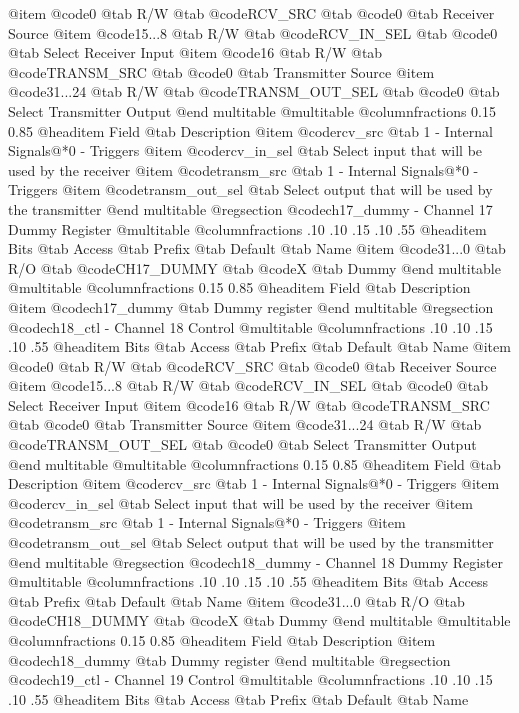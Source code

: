 @item @code{0}
@tab R/W @tab
@code{RCV_SRC}
@tab @code{0} @tab 
Receiver Source
@item @code{15...8}
@tab R/W @tab
@code{RCV_IN_SEL}
@tab @code{0} @tab 
Select Receiver Input
@item @code{16}
@tab R/W @tab
@code{TRANSM_SRC}
@tab @code{0} @tab 
Transmitter Source
@item @code{31...24}
@tab R/W @tab
@code{TRANSM_OUT_SEL}
@tab @code{0} @tab 
Select Transmitter Output
@end multitable
@multitable @columnfractions 0.15 0.85
@headitem Field @tab Description
@item @code{rcv_src} @tab 1 - Internal Signals@*0 - Triggers
@item @code{rcv_in_sel} @tab Select input that will be used by the receiver
@item @code{transm_src} @tab 1 - Internal Signals@*0 - Triggers
@item @code{transm_out_sel} @tab Select output that will be used by the transmitter
@end multitable
@regsection @code{ch17_dummy} - Channel 17 Dummy Register
@multitable @columnfractions .10 .10 .15 .10 .55
@headitem Bits @tab Access @tab Prefix @tab Default @tab Name
@item @code{31...0}
@tab R/O @tab
@code{CH17_DUMMY}
@tab @code{X} @tab 
Dummy
@end multitable
@multitable @columnfractions 0.15 0.85
@headitem Field @tab Description
@item @code{ch17_dummy} @tab Dummy register
@end multitable
@regsection @code{ch18_ctl} - Channel 18 Control
@multitable @columnfractions .10 .10 .15 .10 .55
@headitem Bits @tab Access @tab Prefix @tab Default @tab Name
@item @code{0}
@tab R/W @tab
@code{RCV_SRC}
@tab @code{0} @tab 
Receiver Source
@item @code{15...8}
@tab R/W @tab
@code{RCV_IN_SEL}
@tab @code{0} @tab 
Select Receiver Input
@item @code{16}
@tab R/W @tab
@code{TRANSM_SRC}
@tab @code{0} @tab 
Transmitter Source
@item @code{31...24}
@tab R/W @tab
@code{TRANSM_OUT_SEL}
@tab @code{0} @tab 
Select Transmitter Output
@end multitable
@multitable @columnfractions 0.15 0.85
@headitem Field @tab Description
@item @code{rcv_src} @tab 1 - Internal Signals@*0 - Triggers
@item @code{rcv_in_sel} @tab Select input that will be used by the receiver
@item @code{transm_src} @tab 1 - Internal Signals@*0 - Triggers
@item @code{transm_out_sel} @tab Select output that will be used by the transmitter
@end multitable
@regsection @code{ch18_dummy} - Channel 18 Dummy Register
@multitable @columnfractions .10 .10 .15 .10 .55
@headitem Bits @tab Access @tab Prefix @tab Default @tab Name
@item @code{31...0}
@tab R/O @tab
@code{CH18_DUMMY}
@tab @code{X} @tab 
Dummy
@end multitable
@multitable @columnfractions 0.15 0.85
@headitem Field @tab Description
@item @code{ch18_dummy} @tab Dummy register
@end multitable
@regsection @code{ch19_ctl} - Channel 19 Control
@multitable @columnfractions .10 .10 .15 .10 .55
@headitem Bits @tab Access @tab Prefix @tab Default @tab Name
